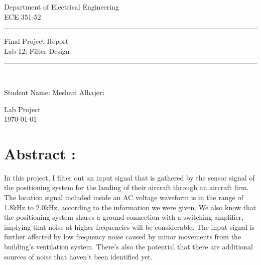 \documentclass[a4paper,11pt]{article}
\begin{document}




\begin{titlepage} 
\begin{center}

{\Large Department of Electrical Engineering}
\\[2cm]
{\Large ECE 351-52}\\[2cm]


\rule{\linewidth}{2px}

\linespread{1.2}\huge {

Final Project Report
\\ Lab 12: Filter Design
\\ 

}
\rule{\linewidth}{2px}
\linespread{1}~\\[2cm]

{\Large 

Student Name: Meshari Alhajeri

}




\vfill
{\large Lab Project }\\[0.3cm] 



\today 
\end{center}
\end{titlepage}



\newpage
\thispagestyle{empty}



\section{Abstract :}
In this project, I filter out an input signal that is gathered by the sensor signal of the positioning system for the landing of their aircraft through an aircraft firm. The location signal included inside an AC voltage waveform is in the range of 1.8kHz to 2.0kHz, according to the information we were given. We also know that the positioning system shares a ground connection with a switching amplifier, implying that noise at higher frequencies will be considerable. The input signal is further affected by low frequency noise caused by minor movements from the building's ventilation system. There's also the potential that there are additional sources of noise that haven't been identified yet.
\end{document}
